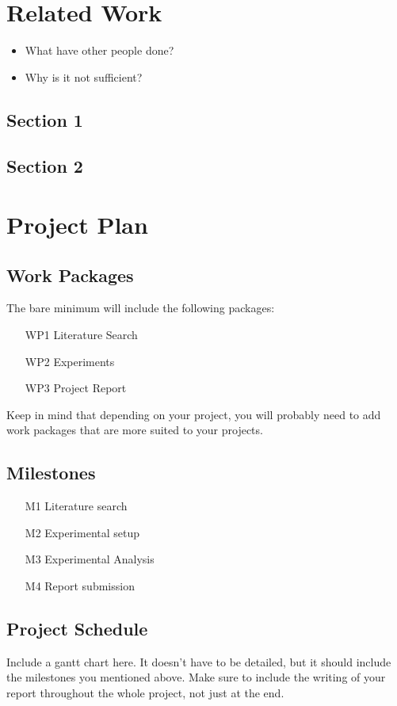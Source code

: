 \documentclass[rnd]{mas_proposal}
\begin{document}
\chapter{Related Work}
\begin{itemize}
    \item What have other people done?
    \item Why is it not sufficient?
\end{itemize}

\section{Section 1}
\section{Section 2}



\chapter{Project Plan}

\section{Work Packages}
The bare minimum will include the following packages:
\begin{enumerate}
    \item[WP1] Literature Search
    \item[WP2] Experiments
    \item[WP3] Project Report
\end{enumerate}
Keep in mind that depending on your project, you will probably need to add work packages that are more suited to your projects.

\section{Milestones}
\begin{enumerate}
    \item[M1] Literature search
    \item[M2] Experimental setup
    \item[M3] Experimental Analysis
    \item[M4] Report submission
\end{enumerate}

\section{Project Schedule}
Include a gantt chart here. It doesn't have to be detailed, but it should include the milestones you mentioned above.
Make sure to include the writing of your report throughout the whole project, not just at the end.
\end{document}
